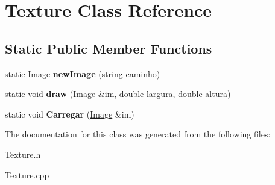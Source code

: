 \hypertarget{classTexture}{\section{\-Texture \-Class \-Reference}
\label{classTexture}
}
\subsection*{\-Static \-Public \-Member \-Functions}
\begin{DoxyCompactItemize}
\item 
\hypertarget{classTexture_a823a87ab61d73d96d7b3626650cbf3f7}{static \hyperlink{classImage}{\-Image} {\bfseries new\-Image} (string caminho)}\label{classTexture_a823a87ab61d73d96d7b3626650cbf3f7}

\item 
\hypertarget{classTexture_a0d4183fbf8af80a0365358a1ac7d887b}{static void {\bfseries draw} (\hyperlink{classImage}{\-Image} \&im, double largura, double altura)}\label{classTexture_a0d4183fbf8af80a0365358a1ac7d887b}

\item 
\hypertarget{classTexture_a39190edf6a49c9b717847b60f30480f8}{static void {\bfseries \-Carregar} (\hyperlink{classImage}{\-Image} \&im)}\label{classTexture_a39190edf6a49c9b717847b60f30480f8}

\end{DoxyCompactItemize}


\-The documentation for this class was generated from the following files\-:\begin{DoxyCompactItemize}
\item 
\-Texture.\-h\item 
\-Texture.\-cpp\end{DoxyCompactItemize}
